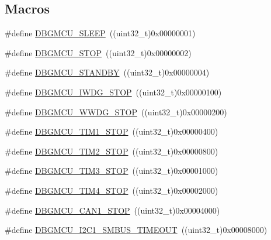 \subsection*{Macros}
\begin{DoxyCompactItemize}
\item 
\#define \hyperlink{group___d_b_g_m_c_u___exported___constants_ga1c457289646b9d9814b93fbb994c9930}{D\+B\+G\+M\+C\+U\+\_\+\+S\+L\+E\+EP}~((uint32\+\_\+t)0x00000001)
\item 
\#define \hyperlink{group___d_b_g_m_c_u___exported___constants_ga4a71bcfa6868672674b5410d2fd372f4}{D\+B\+G\+M\+C\+U\+\_\+\+S\+T\+OP}~((uint32\+\_\+t)0x00000002)
\item 
\#define \hyperlink{group___d_b_g_m_c_u___exported___constants_ga6eb848845f9207ffdccd0590da192002}{D\+B\+G\+M\+C\+U\+\_\+\+S\+T\+A\+N\+D\+BY}~((uint32\+\_\+t)0x00000004)
\item 
\#define \hyperlink{group___d_b_g_m_c_u___exported___constants_ga5b8b38b5589a2e26a57325553b5dfe23}{D\+B\+G\+M\+C\+U\+\_\+\+I\+W\+D\+G\+\_\+\+S\+T\+OP}~((uint32\+\_\+t)0x00000100)
\item 
\#define \hyperlink{group___d_b_g_m_c_u___exported___constants_ga9ecfb95a943e2ad165395fff4fa12770}{D\+B\+G\+M\+C\+U\+\_\+\+W\+W\+D\+G\+\_\+\+S\+T\+OP}~((uint32\+\_\+t)0x00000200)
\item 
\#define \hyperlink{group___d_b_g_m_c_u___exported___constants_ga017fb3101a3569426e82b066cb2f8848}{D\+B\+G\+M\+C\+U\+\_\+\+T\+I\+M1\+\_\+\+S\+T\+OP}~((uint32\+\_\+t)0x00000400)
\item 
\#define \hyperlink{group___d_b_g_m_c_u___exported___constants_ga8ba3a77260f748793c903468a4608bd1}{D\+B\+G\+M\+C\+U\+\_\+\+T\+I\+M2\+\_\+\+S\+T\+OP}~((uint32\+\_\+t)0x00000800)
\item 
\#define \hyperlink{group___d_b_g_m_c_u___exported___constants_ga28c01c2c30bed78e51d997007986fac9}{D\+B\+G\+M\+C\+U\+\_\+\+T\+I\+M3\+\_\+\+S\+T\+OP}~((uint32\+\_\+t)0x00001000)
\item 
\#define \hyperlink{group___d_b_g_m_c_u___exported___constants_gac87363a4018e2b23a907cfaf836494f1}{D\+B\+G\+M\+C\+U\+\_\+\+T\+I\+M4\+\_\+\+S\+T\+OP}~((uint32\+\_\+t)0x00002000)
\item 
\#define \hyperlink{group___d_b_g_m_c_u___exported___constants_ga5ef70e050d1a95f350b6585336a55ca8}{D\+B\+G\+M\+C\+U\+\_\+\+C\+A\+N1\+\_\+\+S\+T\+OP}~((uint32\+\_\+t)0x00004000)
\item 
\#define \hyperlink{group___d_b_g_m_c_u___exported___constants_ga1c0566af96833376cf1af98449cc914b}{D\+B\+G\+M\+C\+U\+\_\+\+I2\+C1\+\_\+\+S\+M\+B\+U\+S\+\_\+\+T\+I\+M\+E\+O\+UT}~((uint32\+\_\+t)0x00008000)

\end{DoxyCompactItemize}
